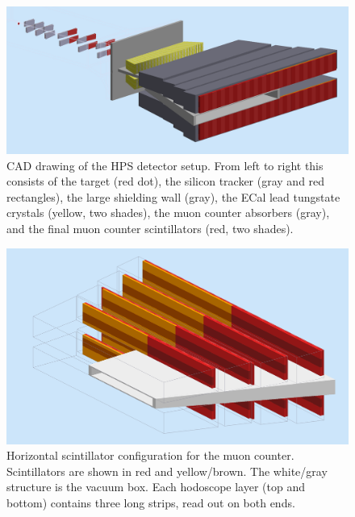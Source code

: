 \begin{figure}[!ht]
\includegraphics[scale=0.22]{muon/HPS_view2.png}
\caption{\small{CAD drawing of the HPS detector setup.  From left to right this consists of the target (red dot), the silicon tracker
(gray and red rectangles), the large shielding wall (gray), the ECal lead tungstate crystals (yellow, two shades), the muon counter absorbers
(gray), and the final muon counter scintillators (red, two shades).}}
\label{fig:HPS_view2}
\end{figure}


\begin{figure}[!ht]
\includegraphics[scale=0.22]{muon/Muon2b.png}
\caption{\small{Horizontal scintillator configuration for the muon counter. Scintillators are
shown in red and yellow/brown.  The white/gray structure is the vacuum box.  Each hodoscope layer (top
and bottom) contains three long strips, read out on both ends.
}}
\label{fig:Muon2p}
\end{figure}


